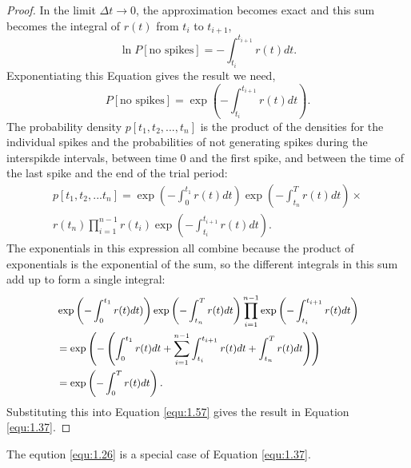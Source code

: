 \begin{thm}
\begin{proof}
    In the limit $\Delta t \to 0$, the approximation becomes exact and this sum becomes the  integral of $r(t)$ from $t_i$ to $t_{i+1}$, 
    \begin{equation}
      \ln P[\text{no spikes}]=-\int_{t_i}^{t_{i+1}}r(t)dt.
      \label{equ:1.55}
    \end{equation}
    Exponentiating this Equation gives the result we need,             
    \begin{equation}
      P[\text{no spikes}]=\exp\left(-\int_{t_i}^{t_{i+1}}r(t)dt\right).
      \label{equ:1.56}
    \end{equation}
    The probability density $p[t_1, t_2, ..., t_n]$ is the product of the densities for the individual spikes and the probabilities of not generating spikes during the interspikde intervals, between time $0$ and the first spike,  and between the time of the last spike and the end of the trial period:            
    \begin{equation}
      \begin{aligned}
        p[t_1, t_2, ...t_n]=\exp\left(-\int_0^{t_1}r(t)dt\right)\exp\left(-\int_{t_n}^Tr(t)dt\right)\times \\  r(t_n)\prod_{i=1}^{n-1}r(t_i)\exp\left(-\int_{t_i}^{t_{i+1}}r(t)dt\right).
      \end{aligned}
      \label{equ:1.57}
    \end{equation}
    The exponentials in this expression all combine because the product of exponentials is the exponential of the sum, so the different integrals in this sum add up to form a single integral:            
    \begin{equation}
      \small
      \begin{aligned}
        &\exp\left(-\int_0^{t_1}r(t)dt)\right)\exp\left(-\int_{t_n}^Tr(t)dt\right)\prod_{i=1}^{n-1}\exp\left(-\int_{t_i}^{t_{i+1}}r(t)dt\right)\\
        &=\exp\left(-\left(\int_0^{t_1}r(t)dt+\sum_{i=1}^{n-1}\int_{t_i}^{t_{i+1}}r(t)dt+\int_{t_n}^Tr(t)dt\right)\right)\\
        &=\exp\left(-\int_0^Tr(t)dt\right) .
      \end{aligned}
      \label{equ:1.58}
    \end{equation}
    Substituting this into Equation \ref{equ:1.57} gives the result in Equation \ref{equ:1.37}.
  \end{proof}\qedhere
\end{thm}

\begin{rem}
  The eqution \ref{equ:1.26} is a special case of Equation \ref{equ:1.37}.
\end{rem}

